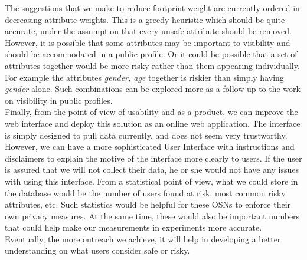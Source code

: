 \documentclass[10pt,conference]{IEEEtran}
\begin{document}
The suggestions that we make to reduce footprint weight are currently ordered in decreasing attribute weights. This is a greedy heuristic which should be quite accurate, under the assumption that every unsafe attribute should be removed. However, it is possible that some attributes may be important to visibility and should be accommodated in a public profile. Or it could be possible that a set of attributes together would be more risky rather than them appearing individually. For example the attributes \textit{gender, age} together is riskier than simply having \textit{gender} alone. Such combinations can be explored more as a follow up to the work on visibility in public profiles.\\

Finally, from the point of view of usability and as a product, we can improve the web interface and deploy this solution as an online web application. The interface is simply designed to pull data currently, and does not seem very trustworthy. However, we can have a more sophisticated User Interface with instructions and disclaimers to explain the motive of the interface more clearly to users. If the user is assured that we will not collect their data, he or she would not have any issues with using this interface. From a statistical point of view, what we could store in the database would be the number of users found at risk, most common risky attributes, etc. Such statistics would be helpful for these OSNs to enforce their own privacy measures. At the same time, these would also be important numbers that could help make our measurements in experiments more accurate. Eventually, the more outreach we achieve, it will help in developing a better understanding on what users consider safe or risky. \\	
\end{document}
